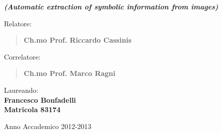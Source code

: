 \begin{titlepage}
\begin{center}

\vspace{0.5cm}

{\small \emph{\textbf{(Automatic extraction of symbolic information from images)}}} \\

\vspace{1.5cm}

\begin{flushleft}

{\normalsize Relatore:}
\begin{quote}
{\large \textbf{Ch.mo Prof. Riccardo Cassinis}} \\
\vspace{0.2cm}
\end{quote}

{\normalsize Correlatore:}
\begin{quote}
{\large \textbf{Ch.mo Prof. Marco Ragni}} \\
\vspace{0.2cm}
\end{quote}

\end{flushleft}


\begin{flushright}
Laureando: \\
\textbf{Francesco Bonfadelli} \\
\vspace{0.05cm}
\textbf{Matricola 83174} \\
\vspace{1.5cm}
\end{flushright}

\large{Anno Accademico 2012-2013}

\end{center}
\end{titlepage}
